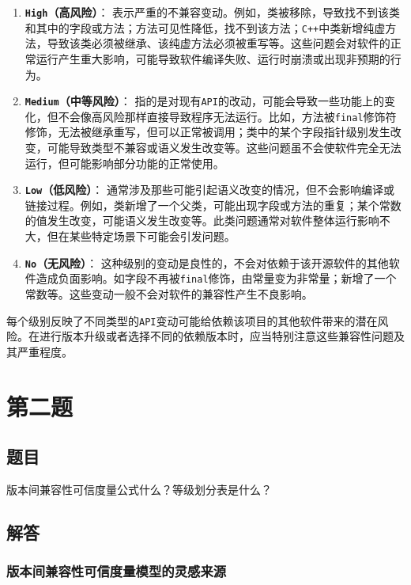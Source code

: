 \documentclass{article}
\begin{document}
\begin{enumerate}
	\item \textbf{\texttt{High}（高风险）}：
	表示严重的不兼容变动。例如，类被移除，导致找不到该类和其中的字段或方法；方法可见性降低，找不到该方法；\texttt{C++}中类新增纯虚方法，导致该类必须被继承、该纯虚方法必须被重写等。这些问题会对软件的正常运行产生重大影响，可能导致软件编译失败、运行时崩溃或出现非预期的行为。
	
	\item \textbf{\texttt{Medium}（中等风险）}：
	指的是对现有\texttt{API}的改动，可能会导致一些功能上的变化，但不会像高风险那样直接导致程序无法运行。比如，方法被\texttt{final}修饰符修饰，无法被继承重写，但可以正常被调用；类中的某个字段指针级别发生改变，可能导致类型不兼容或语义发生改变等。这些问题虽不会使软件完全无法运行，但可能影响部分功能的正常使用。
	
	\item \textbf{\texttt{Low}（低风险）}：
	通常涉及那些可能引起语义改变的情况，但不会影响编译或链接过程。例如，类新增了一个父类，可能出现字段或方法的重复；某个常数的值发生改变，可能语义发生改变等。此类问题通常对软件整体运行影响不大，但在某些特定场景下可能会引发问题。
	
	\item \textbf{\texttt{No}（无风险）}：
	这种级别的变动是良性的，不会对依赖于该开源软件的其他软件造成负面影响。如字段不再被\texttt{final}修饰，由常量变为非常量；新增了一个常数等。这些变动一般不会对软件的兼容性产生不良影响。
\end{enumerate}

每个级别反映了不同类型的\texttt{API}变动可能给依赖该项目的其他软件带来的潜在风险。在进行版本升级或者选择不同的依赖版本时，应当特别注意这些兼容性问题及其严重程度。

\section{第二题}

\subsection{题目}

版本间兼容性可信度量公式什么？等级划分表是什么？

\subsection{解答}

\subsubsection{版本间兼容性可信度量模型的灵感来源}
\end{document}
